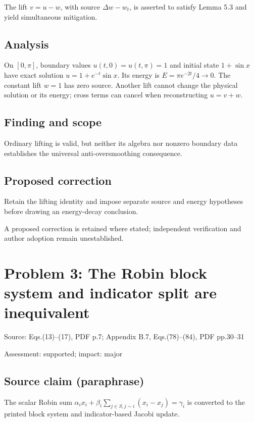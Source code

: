 \documentclass[11pt]{article}
\begin{document}
The lift \(v=u-w\), with source \(\Delta w-w_t\), is asserted to satisfy Lemma 5.3 and yield simultaneous mitigation.

\subsection*{Analysis}

On \([0,\pi]\), boundary values \(u(t,0)=u(t,\pi)=1\) and initial state \(1+\sin x\) have exact solution \(u=1+e^{-t}\sin x\). Its energy is \(E=\pi e^{-2t}/4\to0\). The constant lift \(w=1\) has zero source. Another lift cannot change the physical solution or its energy; cross terms can cancel when reconstructing \(u=v+w\).

\subsection*{Finding and scope}

Ordinary lifting is valid, but neither its algebra nor nonzero boundary data establishes the universal anti-oversmoothing consequence.

\subsection*{Proposed correction}

Retain the lifting identity and impose separate source and energy hypotheses before drawing an energy-decay conclusion.

A proposed correction is retained where stated; independent verification and author adoption remain unestablished.

\section*{Problem 3: The Robin block system and indicator split are inequivalent}

Source: Eqs.(13)–(17), PDF p.7; Appendix B.7, Eqs.(78)–(84), PDF pp.30–31

Assessment: supported; impact: major

\subsection*{Source claim (paraphrase)}

The scalar Robin sum \(\alpha_i x_i+\beta_i\sum_{j\in S,j\sim i}(x_i-x_j)=\gamma_i\) is converted to the printed block system and indicator-based Jacobi update.
\end{document}
